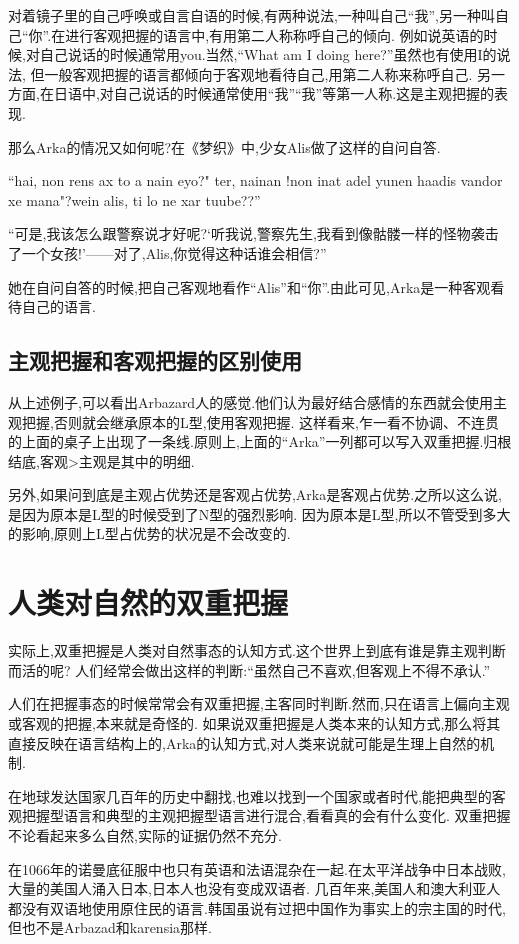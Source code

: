对着镜子里的自己呼唤或自言自语的时候,有两种说法,一种叫自己``我'',另一种叫自己``你''.在进行客观把握的语言中,有用第二人称称呼自己的倾向.
例如说英语的时候,对自己说话的时候通常用you.当然,``What am I doing here?''虽然也有使用I的说法,
但一般客观把握的语言都倾向于客观地看待自己,用第二人称来称呼自己.
另一方面,在日语中,对自己说话的时候通常使用``我''``我''等第一人称.这是主观把握的表现.

那么Arka的情况又如何呢?在《梦织》中,少女Alis做了这样的自问自答.
{\kaishu 
``hai, non rens ax to a nain eyo?" ter, nainan !non inat adel yunen haadis vandor xe mana"?wein alis, ti lo ne xar tuube??''

``可是,我该怎么跟警察说才好呢?‘听我说,警察先生,我看到像骷髅一样的怪物袭击了一个女孩!’——对了,Alis,你觉得这种话谁会相信?''
}

她在自问自答的时候,把自己客观地看作``Alis''和``你''.由此可见,Arka是一种客观看待自己的语言.


\subsection{主观把握和客观把握的区别使用}
从上述例子,可以看出Arbazard人的感觉.他们认为最好结合感情的东西就会使用主观把握,否则就会继承原本的L型,使用客观把握.
这样看来,乍一看不协调、不连贯的上面的桌子上出现了一条线.原则上,上面的``Arka''一列都可以写入双重把握.归根结底,客观>主观是其中的明细.

另外,如果问到底是主观占优势还是客观占优势,Arka是客观占优势.之所以这么说,是因为原本是L型的时候受到了N型的强烈影响.
因为原本是L型,所以不管受到多大的影响,原则上L型占优势的状况是不会改变的.


\section{人类对自然的双重把握}
实际上,双重把握是人类对自然事态的认知方式.这个世界上到底有谁是靠主观判断而活的呢?
人们经常会做出这样的判断:``虽然自己不喜欢,但客观上不得不承认.''

人们在把握事态的时候常常会有双重把握,主客同时判断.然而,只在语言上偏向主观或客观的把握,本来就是奇怪的.
如果说双重把握是人类本来的认知方式,那么将其直接反映在语言结构上的,Arka的认知方式,对人类来说就可能是生理上自然的机制.

在地球发达国家几百年的历史中翻找,也难以找到一个国家或者时代,能把典型的客观把握型语言和典型的主观把握型语言进行混合,看看真的会有什么变化.
双重把握不论看起来多么自然,实际的证据仍然不充分.

在1066年的诺曼底征服中也只有英语和法语混杂在一起.在太平洋战争中日本战败,大量的美国人涌入日本,日本人也没有变成双语者.
几百年来,美国人和澳大利亚人都没有双语地使用原住民的语言.韩国虽说有过把中国作为事实上的宗主国的时代,但也不是Arbazad和karensia那样.

